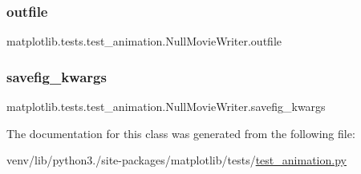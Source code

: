 \subsubsection{\texorpdfstring{outfile}{outfile}}
{\footnotesize\ttfamily matplotlib.\+tests.\+test\+\_\+animation.\+Null\+Movie\+Writer.\+outfile}

\mbox{\label{classmatplotlib_1_1tests_1_1test__animation_1_1NullMovieWriter_aac8e7518460aaa00edeac663ad79ab21}} 
\subsubsection{\texorpdfstring{savefig\+\_\+kwargs}{savefig\_kwargs}}
{\footnotesize\ttfamily matplotlib.\+tests.\+test\+\_\+animation.\+Null\+Movie\+Writer.\+savefig\+\_\+kwargs}



The documentation for this class was generated from the following file\+:\begin{DoxyCompactItemize}
\item 
venv/lib/python3./site-\/packages/matplotlib/tests/\hyperlink{test__animation_8py}{test\+\_\+animation.\+py}\end{DoxyCompactItemize}
